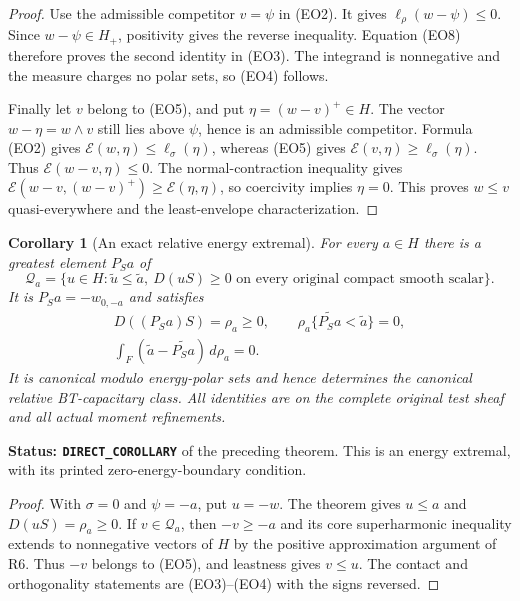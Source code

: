 \documentclass[11pt,a4paper]{article}
\numberwithin{equation}{section}
\newtheorem{corollary}[theorem]{Corollary}
\theoremstyle{definition}
\theoremstyle{remark}
\begin{document}
\begin{proof}
Use the admissible competitor $v=\psi$ in (EO2).  It gives
$\ell_\rho(w-\psi)\leq0$.  Since $w-\psi\in H_+$,
positivity gives the reverse inequality.  Equation (EO8)
therefore proves the second identity in (EO3).
The integrand is nonnegative and the measure charges no polar
sets, so (EO4) follows.

Finally let $v$ belong to (EO5), and put $\eta=(w-v)^+\in H$.
The vector $w-\eta=w\wedge v$ still lies above $\psi$,
hence is an admissible competitor.  Formula (EO2) gives
$\mathcal E(w,\eta)\leq\ell_\sigma(\eta)$, whereas (EO5)
gives $\mathcal E(v,\eta)\geq\ell_\sigma(\eta)$.
Thus $\mathcal E(w-v,\eta)\leq0$.
The normal-contraction inequality gives
$\mathcal E(w-v,(w-v)^+)\geq\mathcal E(\eta,\eta)$,
so coercivity implies $\eta=0$.  This proves $w\leq v$
quasi-everywhere and the least-envelope characterization.
\end{proof}

\begin{corollary}[An exact relative energy extremal]
\label{cor:r11-relative-energy-extremal}
For every $a\in H$ there is a greatest element $P_Sa$ of
\[
 \mathscr Q_a=
 \{u\in H:\widetilde u\leq\widetilde a,\
                 D(uS)\geq0\text{ on every original compact smooth scalar}\}.
 \tag{EO9}
\]
It is $P_Sa=-w_{0,-a}$ and satisfies
\[
 \begin{gathered}
       D((P_Sa)S)=\rho_a\geq0,\qquad
       \rho_a\{\widetilde{P_Sa}<\widetilde a\}=0,\\
                    \int_F(\widetilde a-\widetilde{P_Sa})\,d\rho_a=0.
 \end{gathered}
 \tag{EO10}
\]
It is canonical modulo energy-polar sets and hence determines
the canonical relative BT-capacitary class.
All identities are on the complete original test sheaf and
all actual moment refinements.
\end{corollary}

\noindent\textbf{Status: \texttt{DIRECT\_COROLLARY}} of the
preceding theorem.  This is an energy extremal, with its
printed zero-energy-boundary condition.

\begin{proof}
With $\sigma=0$ and $\psi=-a$, put $u=-w$.
The theorem gives $u\leq a$ and $D(uS)=\rho_a\geq0$.
If $v\in\mathscr Q_a$, then $-v\geq-a$ and its core
superharmonic inequality extends to nonnegative vectors of
$H$ by the positive approximation argument of R6.
Thus $-v$ belongs to (EO5), and leastness gives $v\leq u$.
The contact and orthogonality statements are (EO3)--(EO4)
with the signs reversed.
\end{proof}
\end{document}
